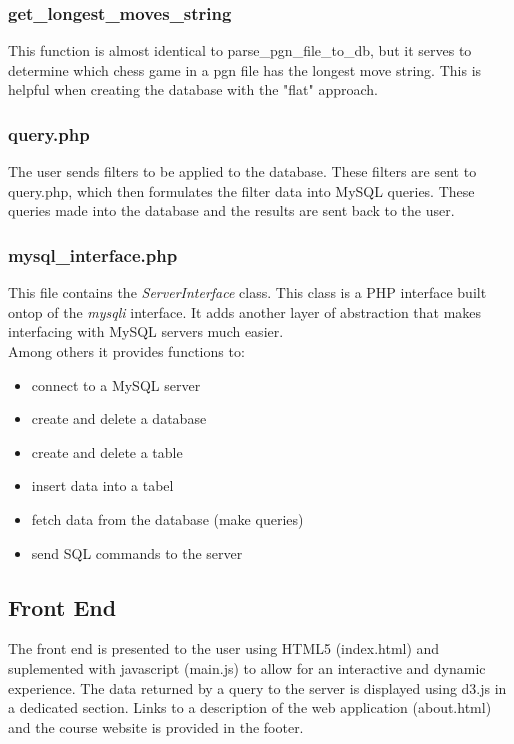 \documentclass{article}
\begin{document}
\subsubsection*{get\_longest\_moves\_string}
This function is almost identical to parse\_pgn\_file\_to\_db, but it serves to determine which chess game in a pgn file has the longest move string.  This is helpful when creating the database with the "flat" approach.  


\subsubsection{query.php}
The user sends filters to be applied to the database.  These filters are sent to query.php, which then formulates the filter data into MySQL queries.  These queries made into the database and the results are sent back to the user.  


\subsubsection{mysql\_interface.php}
This file contains the \textit{ServerInterface} class. This class is a PHP interface built ontop of the \textit{mysqli} interface. It adds another layer of abstraction that makes interfacing with MySQL servers much easier.
\\Among others it provides functions to:
\begin{itemize}
	\item connect to a MySQL server
	\item create and delete a database
	\item create and delete a table
	\item insert data into a tabel
	\item fetch data from the database (make queries)
	\item send SQL commands to the server
\end{itemize}



\subsection{Front End}

The front end is presented to the user using HTML5 (index.html) and suplemented with javascript (main.js) to allow for an interactive and dynamic experience.  The data returned by a query to the server is displayed using d3.js in a dedicated section.  Links to a description of the web application (about.html) and the course 
website is provided in the footer.
\end{document}
